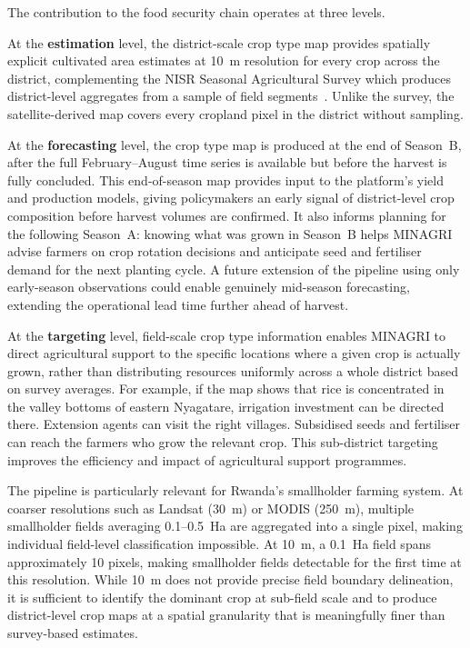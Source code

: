 The contribution to the food security chain operates at three
levels.

At the \textbf{estimation} level, the district-scale crop type
map provides spatially explicit cultivated area estimates at 10~m
resolution for every crop across the district, complementing the
NISR Seasonal Agricultural Survey which produces district-level
aggregates from a sample of field segments~\cite{nisr2025sas}.
Unlike the survey, the satellite-derived map covers every
cropland pixel in the district without sampling.

At the \textbf{forecasting} level, the crop type map is produced
at the end of Season~B, after the full February--August time
series is available but before the harvest is fully concluded.
This end-of-season map provides input to the platform's yield
and production models, giving policymakers an early signal of
district-level crop composition before harvest volumes are
confirmed. It also informs planning for the following Season~A:
knowing what was grown in Season~B helps MINAGRI advise farmers
on crop rotation decisions and anticipate seed and fertiliser
demand for the next planting cycle. A future extension of the
pipeline using only early-season observations could enable
genuinely mid-season forecasting, extending the operational
lead time further ahead of harvest.

At the \textbf{targeting} level, field-scale crop type
information enables MINAGRI to direct agricultural support to
the specific locations where a given crop is actually grown,
rather than distributing resources uniformly across a whole
district based on survey averages. For example, if the map
shows that rice is concentrated in the valley bottoms of eastern
Nyagatare, irrigation investment can be directed there.
Extension agents can visit the right villages. Subsidised seeds
and fertiliser can reach the farmers who grow the relevant crop.
This sub-district targeting improves the efficiency and impact
of agricultural support programmes.

The pipeline is particularly relevant for Rwanda's smallholder
farming system. At coarser resolutions such as Landsat (30~m) or
MODIS (250~m), multiple smallholder fields averaging 0.1--0.5~Ha
are aggregated into a single pixel, making individual field-level
classification impossible. At 10~m, a 0.1~Ha field spans
approximately 10 pixels, making smallholder fields detectable
for the first time at this resolution. While 10~m does not
provide precise field boundary delineation, it is sufficient to
identify the dominant crop at sub-field scale and to produce
district-level crop maps at a spatial granularity that is
meaningfully finer than survey-based estimates.


